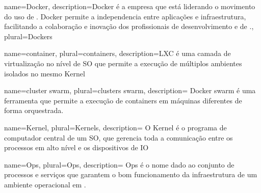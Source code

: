 
\glsaddall

{
  name=Docker,
  description={Docker é a empresa que está liderando o movimento do uso de . Docker permite a independencia entre aplicações e infraestrutura, facilitando a colaboração e inovação dos profissionais de desenvolvimento e de .},
  plural=Dockers
}

{
  name=container,
  plural=containers,
  description={\gls{LXC} é uma camada de virtualização no nível de \gls{SO} que permite a execução de múltiplos ambientes isolados no mesmo \gls{Kernel}
  }
}

{
  name=cluster swarm,
  plural=clusters swarm,
  description={
    \gls{Docker} swarm é uma ferramenta que permite a execução de \glspl{container} em máquinas diferentes de forma orquestrada.
  }
}

{
  name=Kernel,
  plural=Kernels,
  description={
    O Kernel é o programa de computador central de um \gls{SO}, que gerencia toda a comunicação entre os processos em alto nível e os dispositivos de \gls{IO}
  }
}

{
  name=Ops,
  plural=Ops,
  description={
    Ops é o nome dado ao conjunto de processos e serviços que garantem o bom funcionamento da infraestrutura de um ambiente operacional em .
  }
}


